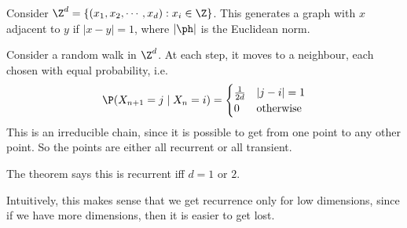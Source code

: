 \documentclass[a4paper]{article}
\begin{document}
\begin{thm}
  Consider $\Z^d = \{(x_1, x_2, \cdots, x_d): x_i \in \Z\}$. This generates a graph with $x$ adjacent to $y$ if $|x - y| = 1$, where $|\ph |$ is the Euclidean norm.
  \begin{center}
  \end{center}
  Consider a random walk in $\Z^d$. At each step, it moves to a neighbour, each chosen with equal probability, i.e.
   \[
    \P(X_{n + 1} = j\mid X_n = i) =
    \begin{cases}
      \frac{1}{2d} & |j - i| = 1\\
      0 & \text{otherwise}
    \end{cases}
  \]
  This is an irreducible chain, since it is possible to get from one point to any other point. So the points are either all recurrent or all transient.

  The theorem says this is recurrent iff $d = 1$ or $2$.
\end{thm}
Intuitively, this makes sense that we get recurrence only for low dimensions, since if we have more dimensions, then it is easier to get lost.
\end{document}
